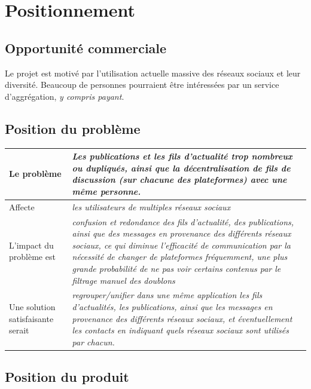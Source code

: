 \documentclass[11pt]{article}
\begin{document}
\section{Positionnement}

\subsection{Opportunité commerciale}


Le projet est motivé par l’utilisation actuelle massive des réseaux sociaux et leur diversité. Beaucoup de personnes pourraient être intéressées par un service d’aggrégation, \textit{y compris payant}.

\subsection{Position du problème}



\begin{tabular}{|a|L{.66\linewidth}|}
	\hline
	Le problème & \textit{Les publications et les fils d’actualité trop nombreux ou dupliqués, ainsi que la décentralisation de fils de discussion (sur chacune des plateformes) avec une même personne.} \\
	\hline
	Affecte & \textit{les utilisateurs de multiples réseaux sociaux} \\
	\hline
	L'impact du problème est & \textit{confusion et redondance des fils d’actualité, des publications, ainsi que des messages en provenance des différents réseaux sociaux, ce qui diminue l'efficacité de communication par la nécessité de changer de plateformes fréquemment, une plus grande probabilité de ne pas voir certains contenus par le filtrage manuel des doublons} \\
	\hline
	Une solution satisfaisante serait & \textit{regrouper/unifier dans une même application les fils d’actualités, les publications, ainsi que les messages en provenance des différents réseaux sociaux, et éventuellement les contacts en indiquant quels réseaux sociaux sont utilisés par chacun.} \\
	\hline
\end{tabular}

\subsection{Position du produit}
\end{document}
